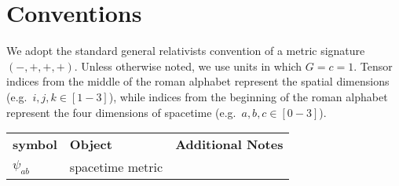 
\section*{Conventions}
\label{sec:conventions}

We adopt the standard general relativists convention of a metric signature
$(-,+,+,+)$. Unless otherwise noted, we use units in which $G=c=1$. Tensor
indices from the middle of the roman alphabet represent the spatial dimensions
(e.g.\ $i,j,k\in[1-3]$), while indices from the beginning of the roman alphabet
represent the four dimensions of spacetime (e.g.\ $a,b,c\in[0-3]$).

\begin{tabular}{lll}
  \textbf{symbol}       & \textbf{Object}           & \textbf{Additional Notes}\\
  $\psi_{ab}$           & spacetime metric          &
\end{tabular}
